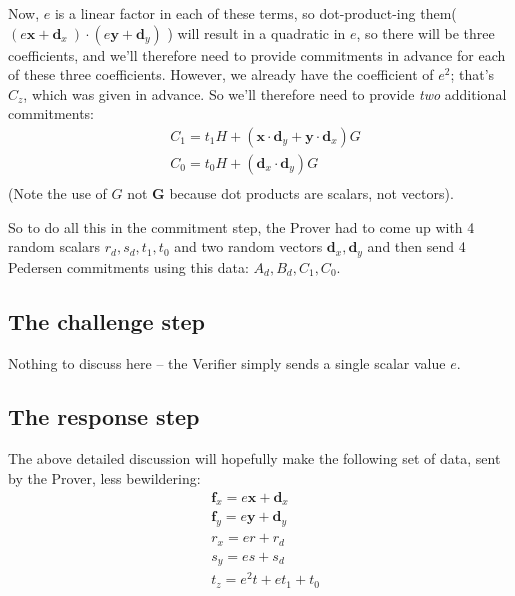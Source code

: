 \documentclass[10pt,a4paper]{article}
\begin{document}
Now, $e$ is a linear factor in each of these terms, so dot-product-ing them($(e\mathbf{x} + \mathbf{d}_x\ )\cdot (e\mathbf{y} + \mathbf{d}_y)$
) will result in a quadratic in $e$, so there will be three coefficients,
and we'll therefore need to provide commitments in advance for each of
these three coefficients. However, we already have the coefficient of $e^2$;
that's $C_z$, which was given in advance. So we'll therefore need to provide
\emph{two} additional commitments:
\begin{align*}
& C_1 = t_1 H + \left(\mathbf{x} \cdot \mathbf{d}_y + \mathbf{y} \cdot \mathbf{d}_x\right)G \\
& C_0 = t_0 H + \left(\mathbf{d}_x \cdot \mathbf{d}_y \right)G \\
\end{align*}
(Note the use of $G$ not $\mathbf{G}$ because dot products are scalars, not
vectors).

So to do all this in the commitment step, the Prover had to come up with
4 random scalars $r_d, s_d, t_1, t_0$ and two random vectors $\mathbf{d}_x, \mathbf{d}_y$ and then send 4 Pedersen
commitments using this data: $A_d, B_d, C_1, C_0$.

\hypertarget{the-challenge-step}{%
\subsection[The challenge
step]{\texorpdfstring{\protect\hypertarget{anchor-37}{}{}The challenge
step}{The challenge step}}\label{the-challenge-step}}

Nothing to discuss here -- the Verifier simply sends a single scalar
value $e$.

\hypertarget{the-response-step}{%
\subsection[The response
step]{\texorpdfstring{\protect\hypertarget{anchor-38}{}{}The response
step}{The response step}}\label{the-response-step}}

The above detailed discussion will hopefully make the following set of
data, sent by the Prover, less bewildering:
\begin{align*}
& \mathbf{f}_x = e\mathbf{x} + \mathbf{d}_x \\
& \mathbf{f}_y = e\mathbf{y} + \mathbf{d}_y \\
& r_x = er + r_d \\
& s_y = es + s_d \\
& t_z = e^2 t + et_1 + t_0 \\
\end{align*}
\end{document}
